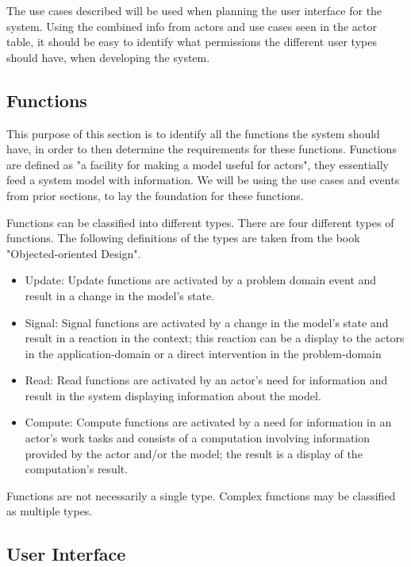The use cases described will be used when planning the user interface for the system. Using the combined info from actors and use cases seen in the actor table, it should be easy to identify what permissions the different user types should have, when developing the system.


\subsection{Functions}

This purpose of this section is to identify all the functions the system should have, in order to then determine the requirements for these functions. Functions are defined as "a facility for making a model useful for actors", they essentially feed a system model with information. 
We will be using the use cases and events from prior sections, to lay the foundation for these functions.

Functions can be classified into different types. There are four different types of functions. The following definitions of the types are taken from the book "Objected-oriented Design"\citep{FACTORPage}.

\begin{itemize}
 
\item Update: Update functions are activated by a problem domain event and result in a change in the model’s state. 

\item Signal: Signal functions are activated by a change in the model’s state and result in a reaction in the context; this reaction can be a display to the actors in the application-domain or a direct intervention in the problem-domain 

\item Read: Read functions are activated by an actor’s need for information and result in the system displaying information about the model. 

\item Compute: Compute functions are activated by a need for information in an actor’s work tasks and consists of a computation involving information provided by the actor and/or the model; the result is a display of the computation’s result. 

\end{itemize}

Functions are not necessarily a single type. Complex functions may be classified as multiple types. \\






\subsection{User Interface}

